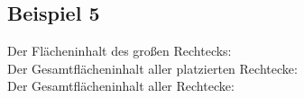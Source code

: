 \subsection{Beispiel 5}\label{ex:5}
Der Flächeninhalt des großen Rechtecks: \\
Der Gesamtflächeninhalt aller platzierten Rechtecke: \\
Der Gesamtflächeninhalt aller Rechtecke: 